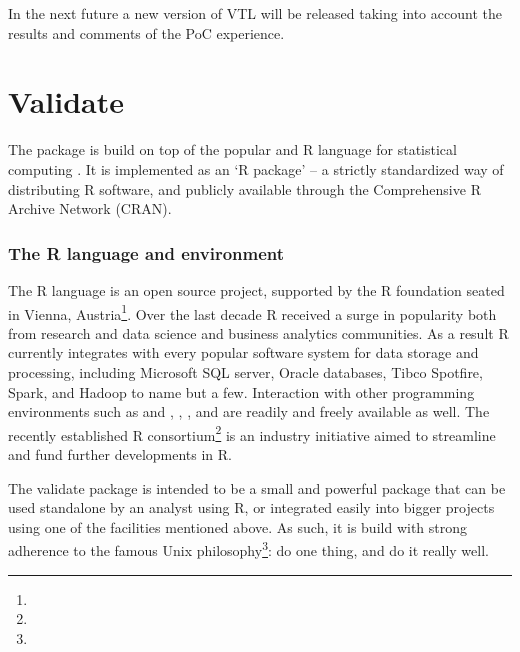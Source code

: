 In the next future a new version of VTL will be released taking into account the results and comments of the PoC experience.

\section{Validate}

The  package \citep{loo:2015} is build on top of the popular and
R language for statistical computing \citep{rcore:2015}. It is
implemented as an `R package' -- a strictly standardized way of distributing R
software, and publicly available through the Comprehensive R Archive Network
(CRAN). 

\subsubsection{The R language and environment}
The R language is an open source project, supported by the R foundation seated
in Vienna, Austria\footnote{}.
Over the last decade R received a surge in popularity both from research and
data science and business analytics communities. As a result R currently
integrates with every popular software system for data storage and processing,
including Microsoft SQL server, Oracle databases, Tibco Spotfire, Spark, and
Hadoop to name but a few.  Interaction with other programming environments such
as  and , , , and  are
readily and freely available as well. The recently established R
consortium\footnote{} is an industry
initiative aimed to streamline and fund further developments in R.


The validate package is intended to be a small and powerful package that can be
used standalone by an analyst using R, or integrated easily into bigger
projects using one of the facilities mentioned above. As such, it is build with
strong adherence to the famous Unix
philosophy\footnote{}: do
one thing, and do it really well.


